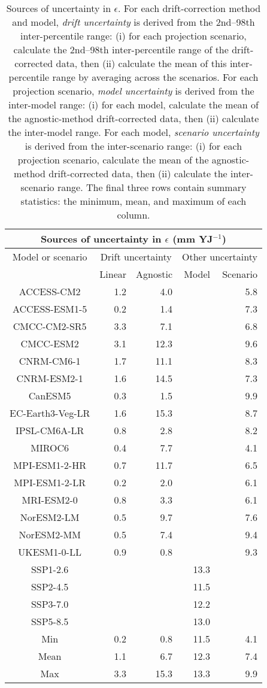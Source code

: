 \begin{table*}[t]
\centering
\caption{Sources of uncertainty in $\epsilon$. For each drift-correction method and model, \emph{drift uncertainty} is derived from the 2nd--98th inter-percentile range: (i) for each projection scenario, calculate the 2nd--98th inter-percentile range of the drift-corrected data, then (ii) calculate the mean of this inter-percentile range by averaging across the scenarios. For each projection scenario, \emph{model uncertainty} is derived from the inter-model range: (i) for each model, calculate the mean of the agnostic-method drift-corrected data, then (ii) calculate the inter-model range. For each model, \emph{scenario uncertainty} is derived from the inter-scenario range: (i) for each projection scenario, calculate the mean of the agnostic-method drift-corrected data, then (ii) calculate the inter-scenario range. The final three rows contain summary statistics: the minimum, mean, and maximum of each column.}
\begin{tabular}{c|rr|rr}
\toprule
\multicolumn{5}{c}{Sources of uncertainty in $\epsilon$ (mm YJ$^{-1}$)} \\ 
\midrule
Model or scenario & \multicolumn{2}{c|}{Drift uncertainty} & \multicolumn{2}{c}{Other uncertainty} \\
 & Linear & Agnostic & Model & Scenario \\
\midrule
ACCESS-CM2 & 1.2 & 4.0 &  & 5.8 \\
ACCESS-ESM1-5 & 0.2 & 1.4 &  & 7.3 \\
CMCC-CM2-SR5 & 3.3 & 7.1 &  & 6.8 \\
CMCC-ESM2 & 3.1 & 12.3 &  & 9.6 \\
CNRM-CM6-1 & 1.7 & 11.1 &  & 8.3 \\
CNRM-ESM2-1 & 1.6 & 14.5 &  & 7.3 \\
CanESM5 & 0.3 & 1.5 &  & 9.9 \\
EC-Earth3-Veg-LR & 1.6 & 15.3 &  & 8.7 \\
IPSL-CM6A-LR & 0.8 & 2.8 &  & 8.2 \\
MIROC6 & 0.4 & 7.7 &  & 4.1 \\
MPI-ESM1-2-HR & 0.7 & 11.7 &  & 6.5 \\
MPI-ESM1-2-LR & 0.2 & 2.0 &  & 6.1 \\
MRI-ESM2-0 & 0.8 & 3.3 &  & 6.1 \\
NorESM2-LM & 0.5 & 9.7 &  & 7.6 \\
NorESM2-MM & 0.5 & 7.4 &  & 9.4 \\
UKESM1-0-LL & 0.9 & 0.8 &  & 9.3 \\
SSP1-2.6 &  &  & 13.3 &  \\
SSP2-4.5 &  &  & 11.5 &  \\
SSP3-7.0 &  &  & 12.2 &  \\
SSP5-8.5 &  &  & 13.0 &  \\
\midrule
Min & 0.2 & 0.8 & 11.5 & 4.1 \\
Mean & 1.1 & 6.7 & 12.3 & 7.4 \\
Max & 3.3 & 15.3 & 13.3 & 9.9 \\
\bottomrule
\end{tabular}
\end{table*}
